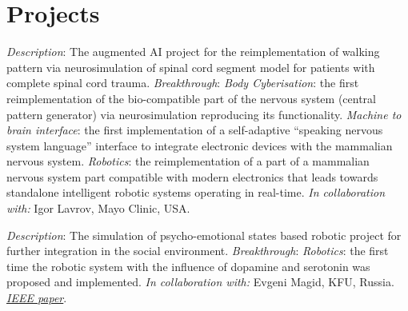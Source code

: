 \documentclass{moderncv}
\begin{document}



    \section{Projects}
    {\small \emph{Description}: The augmented AI project for the reimplementation of walking pattern via neurosimulation of spinal cord segment model for patients with complete spinal cord trauma. \newline{}
    \emph{Breakthrough}:
    \emph{Body Cyberisation}: the first reimplementation of the bio-compatible part of the nervous system (central pattern generator) via neurosimulation reproducing its functionality.
    \emph{Machine to brain interface}: the first implementation of a self-adaptive ``speaking nervous system language'' interface to integrate electronic devices with the mammalian nervous system.
    \emph{Robotics}: the reimplementation of a part of a mammalian nervous system part compatible with modern electronics that leads towards standalone intelligent robotic systems operating in real-time.
    \emph{In collaboration with:} Igor Lavrov, Mayo Clinic, USA.}

    {\small \emph{Description}: The simulation of psycho-emotional states based robotic project for further integration in the social environment. \newline{}
    \emph{Breakthrough}:
    \emph{Robotics}: the first time the robotic system with the influence of dopamine and serotonin was proposed and implemented.
    \emph{In collaboration with:} Evgeni Magid, KFU, Russia.
    \href{https://ieeexplore.ieee.org/document/9073255}{\emph{IEEE paper}}.}
\end{document}
